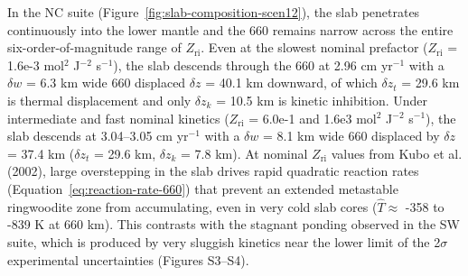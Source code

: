 \documentclass[draft,linenumbers]{agujournal2019}
\begin{document}
In the NC suite (Figure~\ref{fig:slab-composition-scen12}), the slab
penetrates continuously into the lower mantle and the 660 remains narrow
across the entire six-order-of-magnitude range of \(Z_\mathrm{ri}\).
Even at the slowest nominal prefactor (\(Z_\mathrm{ri}\) = 1.6e-3
mol\(^2\) J\(^{-2}\) s\(^{-1}\)), the slab descends through the 660 at
2.96 cm yr\(^{-1}\) with a \(\delta w\) = 6.3 km wide 660 displaced
\(\delta z\) = 40.1 km downward, of which \(\delta z_t\) = 29.6 km is
thermal displacement and only \(\delta z_k\) = 10.5 km is kinetic
inhibition. Under intermediate and fast nominal kinetics
(\(Z_\mathrm{ri}\) = 6.0e-1 and 1.6e3 mol\(^2\) J\(^{-2}\) s\(^{-1}\)),
the slab descends at 3.04--3.05 cm yr\(^{-1}\) with a \(\delta w\) = 8.1
km wide 660 displaced by \(\delta z\) = 37.4 km (\(\delta z_t\) = 29.6
km, \(\delta z_k\) = 7.8 km). At nominal \(Z_\mathrm{ri}\) values from
Kubo et al. (2002), large overstepping in the slab drives rapid
quadratic reaction rates (Equation~\ref{eq:reaction-rate-660}) that
prevent an extended metastable ringwoodite zone from accumulating, even
in very cold slab cores (\(\hat{T} \approx\) -358 to -839 K at 660 km).
This contrasts with the stagnant ponding observed in the SW suite, which
is produced by very sluggish kinetics near the lower limit of the
2\(\sigma\) experimental uncertainties (Figures S3--S4).

\clearpage
\end{document}
